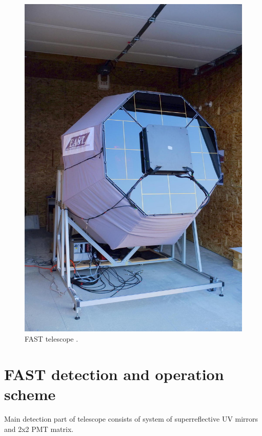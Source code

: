 \begin{figure}[H]
 \centering
 \includegraphics[scale = 0.2]{./pictures/FASTReal}
 \caption{FAST telescope \cite{Project}.}
 \label{FASThut}
 
\end{figure}
\section{FAST detection and operation scheme}
Main detection part of telescope consists of system of superreflective UV mirrors and 2x2 PMT matrix. 

\par



